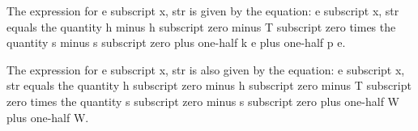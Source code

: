 The expression for e subscript x, str is given by the equation:
e subscript x, str equals the quantity h minus h subscript zero minus T subscript zero times the quantity s minus s subscript zero plus one-half k e plus one-half p e.

The expression for e subscript x, str is also given by the equation:
e subscript x, str equals the quantity h subscript zero minus h subscript zero minus T subscript zero times the quantity s subscript zero minus s subscript zero plus one-half W plus one-half W.